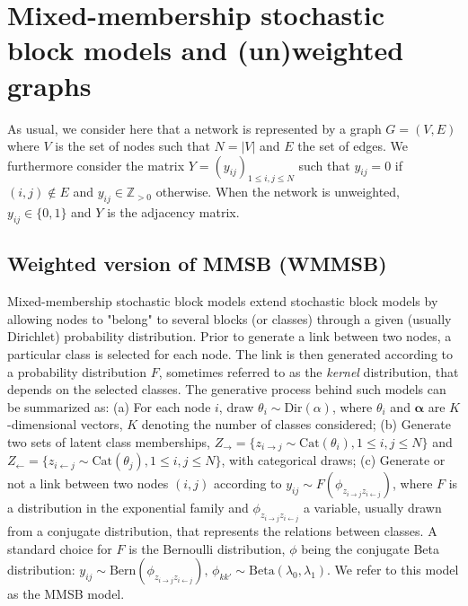 \section{Mixed-membership stochastic block models and (un)weighted graphs}
\label{sec:model}

As usual, we consider here that a network is represented by a graph $G=(V,E)$ where $V$ is the set of nodes such that $N=|V|$ and $E$ the set of edges. We furthermore consider the matrix $Y=(y_{ij})_{1 \le i,j \le N}$ such that $y_{ij}=0$ if $(i,j) \notin E$ and $y_{ij} \in \mathbb{Z}_{>0}$ otherwise. When the network is unweighted, $y_{ij} \in \{0,1\}$ and $Y$ is the adjacency matrix.
\subsection{Weighted version of MMSB (WMMSB)} 
Mixed-membership stochastic block models extend stochastic block models \cite{airoldi2009mixed} by allowing nodes to "belong" to several blocks (or classes) through a given (usually Dirichlet) probability distribution. Prior to generate a link between two nodes, a particular class is selected for each node. The link is then generated according to a probability distribution $F$, sometimes referred to as the \textit{kernel} distribution, that depends on the selected classes. The generative process behind such models can be summarized as: (a) For each node $i$, draw $\theta_i \sim \textrm{Dir}(\alpha)$, where $\theta_i$ and $\boldsymbol{\alpha}$ are $K$-dimensional vectors, $K$ denoting  the number of classes considered; (b) Generate two sets of latent class memberships, $Z_\rightarrow = \{z_{i\rightarrow j} \sim \textrm{Cat}(\theta_i),  1 \le i,j \le N\}$ and $Z_\leftarrow = \{z_{i\leftarrow j} \sim \textrm{Cat}(\theta_j),  1 \le i,j \le N\}$, with categorical draws; (c) Generate or not a link between two nodes $(i,j)$ according to $y_{ij} \sim F(\phi_{z_{i \rightarrow j}z_{i \leftarrow j}})$, where $F$ is a distribution in the exponential family and $\phi_{z_{i \rightarrow j}z_{i \leftarrow j}}$ a variable, usually drawn from a conjugate distribution, that represents the relations between classes. A standard choice for $F$ is the Bernoulli distribution, $\phi$ being the conjugate Beta distribution: $y_{ij} \sim \textrm{Bern}(\phi_{z_{i \rightarrow j}z_{i \leftarrow j}}), \, \phi_{kk'} \sim \textrm{Beta}(\lambda_0, \lambda_1)$. We refer to this model as the MMSB model.

